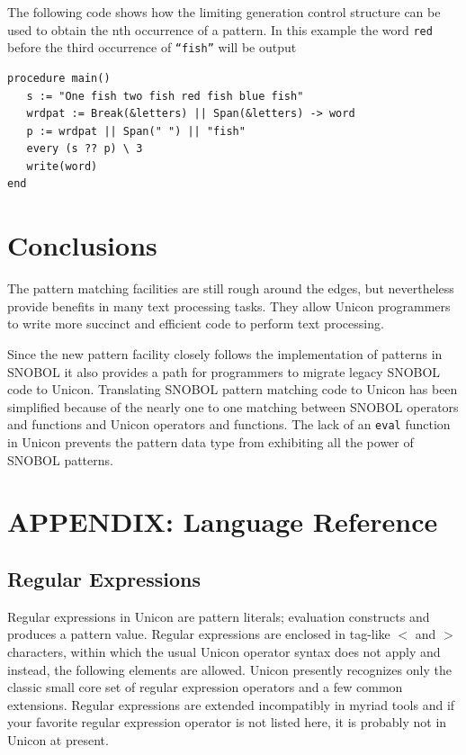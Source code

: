 \documentclass[letterpaper,12pt]{article}
\begin{document}
The following code shows how the limiting generation control structure
can be used to obtain the nth occurrence of a pattern. In this example
the word \texttt{red} before the third occurrence of \texttt{“fish”}
will be output

\begin{verbatim}
procedure main()
   s := "One fish two fish red fish blue fish"
   wrdpat := Break(&letters) || Span(&letters) -> word
   p := wrdpat || Span(" ") || "fish"
   every (s ?? p) \ 3
   write(word)
end 
\end{verbatim}


\section{Conclusions}

The pattern matching facilities are still rough around the edges, but
nevertheless provide benefits in many text processing tasks. They
allow Unicon programmers to write more succinct and efficient code to
perform text processing.

Since the new pattern facility closely follows the implementation of
patterns in SNOBOL it also provides a path for programmers to
migrate legacy SNOBOL code to Unicon. Translating SNOBOL pattern
matching code to Unicon has been simplified because of the
nearly one to one matching between SNOBOL operators and functions and
Unicon operators and functions. The lack of an {\tt eval} function in
Unicon prevents the pattern data type from exhibiting all the power
of SNOBOL patterns.


%
%

\appendix

\section*{APPENDIX: Language Reference}
\thispagestyle{empty}

\subsection*{Regular Expressions}

Regular expressions in Unicon are pattern literals; evaluation
constructs and produces a pattern value.  Regular expressions
are enclosed in tag-like $<$ and $>$ characters, within which
the usual Unicon operator syntax does not apply and instead,
the following elements are allowed.  Unicon presently
recognizes only the classic small core set of regular
expression operators and a few common extensions.
Regular expressions are extended incompatibly in myriad tools and 
if your favorite regular expression operator is not listed here,
it is probably not in Unicon at present.
\end{document}
